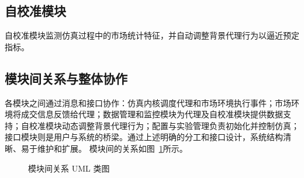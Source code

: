 \subsection{自校准模块\label{subsec:calibration}}

自校准模块监测仿真过程中的市场统计特征，并自动调整背景代理行为以逼近预定指标。

\subsection{模块间关系与整体协作}

各模块之间通过消息和接口协作：仿真内核调度代理和市场环境执行事件；市场环境将成交信息反馈给代理；数据管理和监控模块为代理及自校准模块提供数据支持；自校准模块动态调整背景代理行为；配置与实验管理负责初始化并控制仿真；接口模块则是用户与系统的桥梁。通过上述明确的分工和接口设计，系统结构清晰、易于维护和扩展。
模块间的关系如图~\ref{fig:uml_interaction}所示。

\begin{figure}[h!]
  \centering
  \resizebox{0.9\linewidth}{!}{}
  \caption{模块间关系 UML 类图}
  \label{fig:uml_interaction}
\end{figure}





